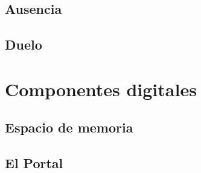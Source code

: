 \subsection{Ausencia}

\subsection{Duelo}

\section{Componentes digitales}

\subsection{Espacio de memoria}

\subsection{El Portal}
